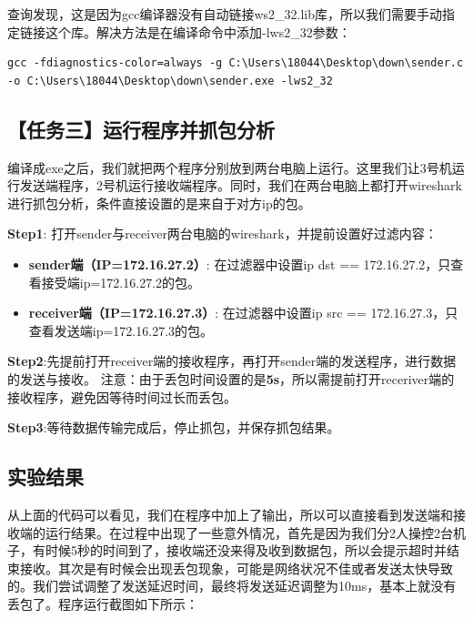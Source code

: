 \documentclass[a4paper]{article}
\begin{document}
查询发现，这是因为gcc编译器没有自动链接ws2\_32.lib库，所以我们需要手动指定链接这个库。解决方法是在编译命令中添加-lws2\_32参数：

\begin{lstlisting}
gcc -fdiagnostics-color=always -g C:\Users\18044\Desktop\down\sender.c -o C:\Users\18044\Desktop\down\sender.exe -lws2_32
\end{lstlisting}
















\subsection{【任务三】运行程序并抓包分析}

编译成exe之后，我们就把两个程序分别放到两台电脑上运行。这里我们让3号机运行发送端程序，2号机运行接收端程序。同时，我们在两台电脑上都打开wireshark进行抓包分析，条件直接设置的是来自于对方ip的包。

\noindent\textbf{Step1}: 打开sender与receiver两台电脑的wireshark，并提前设置好过滤内容：

\begin{itemize}
    \item \textbf{sender端（IP=172.16.27.2）}: 在过滤器中设置ip dst == 172.16.27.2，只查看接受端ip=172.16.27.2的包。
    \item \textbf{receiver端（IP=172.16.27.3）}: 在过滤器中设置ip src == 172.16.27.3，只查看发送端ip=172.16.27.3的包。
\end{itemize}

\noindent\textbf{Step2}:先提前打开receiver端的接收程序，再打开sender端的发送程序，进行数据的发送与接收。
注意：由于丢包时间设置的是\textbf{5s}，所以需提前打开receriver端的接收程序，避免因等待时间过长而丢包。

\vspace{1em}
\noindent\textbf{Step3}:等待数据传输完成后，停止抓包，并保存抓包结果。

\subsection{实验结果}

从上面的代码可以看见，我们在程序中加上了输出，所以可以直接看到发送端和接收端的运行结果。在过程中出现了一些意外情况，首先是因为我们分2人操控2台机子，有时候5秒的时间到了，接收端还没来得及收到数据包，所以会提示超时并结束接收。其次是有时候会出现丢包现象，可能是网络状况不佳或者发送太快导致的。我们尝试调整了发送延迟时间，最终将发送延迟调整为10ms，基本上就没有丢包了。程序运行截图如下所示：
\end{document}
